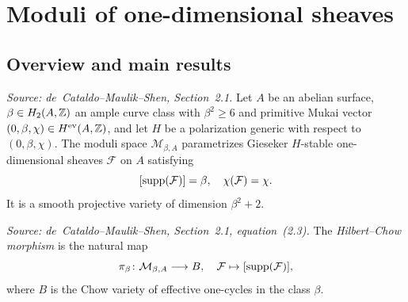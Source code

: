 \section{Moduli of one-dimensional sheaves}

\subsection{Overview and main results}


\begin{definition}
  \label{def:ModuliSheaves}
  \uses{}
  \textit{Source: de~Cataldo--Maulik--Shen, Section~2.1.}
  Let \(A\) be an abelian surface, \(\beta \in H_2(A,\mathbb{Z})\) an ample curve
  class with \(\beta^2 \geq 6\) and primitive Mukai vector
  \((0,\beta,\chi) \in H^{\mathrm{ev}}(A,\mathbb{Z})\), and let \(H\) be a
  polarization generic with respect to \((0,\beta,\chi)\).  The moduli space
  \(\mathcal{M}_{\beta,A}\) parametrizes Gieseker \(H\)-stable one-dimensional
  sheaves \(\mathcal{F}\) on \(A\) satisfying
  \[
    [\operatorname{supp}(\mathcal{F})] = \beta, \quad \chi(\mathcal{F}) = \chi.
  \]
  It is a smooth projective variety of dimension \(\beta^2 + 2\).
\end{definition}

\begin{definition}
  \label{def:HilbChowMorphism}
  \textit{Source: de~Cataldo--Maulik--Shen, Section~2.1, equation~(2.3).}
  The \emph{Hilbert--Chow morphism} is the natural map
  \[
    \pi_\beta \colon \mathcal{M}_{\beta,A} \longrightarrow B,
    \quad \mathcal{F} \mapsto [\operatorname{supp}(\mathcal{F})],
  \]
  where \(B\) is the Chow variety of effective one-cycles in the class
  \(\beta\).
\end{definition}

